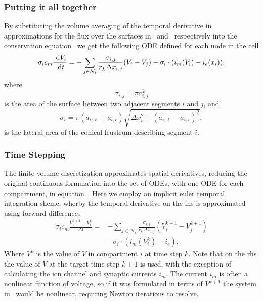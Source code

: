\subsubsection{Putting it all together}
By substituting the volume averaging of the temporal derivative in~ approximations for the flux over the surfaces in~ and~ respectively into the conservation equation~ we get the following ODE defined for each node in the cell
\begin{equation}
    \sigma_i c_m \frac{~\text{d}{V_i}}{~\text{d}{t}}
       = -\sum_{j\in\mathcal{N}_i} {\frac{\sigma_{i,j}}{r_L \Delta x_{i,j}} (V_i-V_j)} - \sigma_i\cdot(i_m(V_i) - i_e(x_i)),
    \label{eq:ode}
\end{equation}
where
\begin{equation}
    \sigma_{i,j} = \pi a_{i,j}^2
    \label{eq:sigma_ij}
\end{equation}
is the area of the surface between two adjacent segments $i$ and $j$, and
\begin{equation}
    \sigma_{i}   = \pi(a_{i,\ell} + a_{i,r}) \sqrt{\Delta x_i^2 + (a_{i,\ell} - a_{i,r})^2},
    \label{eq:sigma_i}
\end{equation}
is the lateral area of the conical frustrum describing segment $i$.

\subsubsection{Time Stepping}
The finite volume discretization approximates spatial derivatives, reducing the original continuous formulation into the set of ODEs, with one ODE for each compartment, in equation~.
Here we employ an implicit euler temporal integration sheme, wherby the temporal derivative on the lhs is approximated using forward differences
\begin{align}
    \sigma_i c_m \frac{V_i^{k+1}-V_i^{k}}{\Delta t}
        = & -\sum_{j\in\mathcal{N}_i} {\frac{\sigma_{i,j}}{r_L \Delta x_{i,j}} (V_i^{k+1}-V_j^{k+1})} \nonumber \\
          & - \sigma_i\cdot(i_m(V_i^{k}) - i_e),
    \label{eq:ode_subs}
\end{align}
Where $V^k$ is the value of $V$ in compartment $i$ at time step $k$.
Note that on the rhs the value of $V$ at the target time step $k+1$ is used, with the exception of calculating the ion channel and synaptic currents $i_m$.
The current $i_m$ is often a nonlinear function of voltage, so if it was formulated in terms of $V^{k+1}$ the system in~ would be nonlinear, requiring Newton iterations to resolve.

